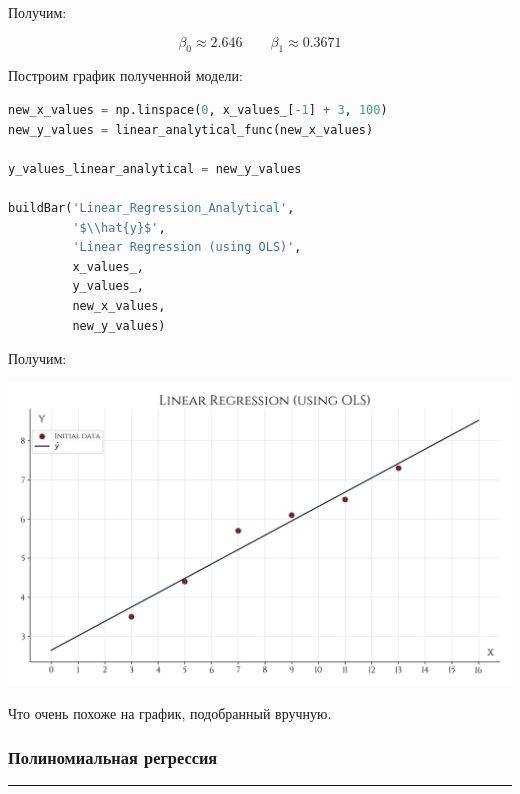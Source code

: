 \documentclass[a4paper, 14pt]{extarticle}
\begin{document}
Получим:

\begin{equation*}
    \beta_0 \approx 2.646 \qquad \beta_1 \approx 0.3671
\end{equation*}

Построим график полученной модели:

\begin{center}
    \begin{lstlisting}[language=Python]
new_x_values = np.linspace(0, x_values_[-1] + 3, 100)
new_y_values = linear_analytical_func(new_x_values)

y_values_linear_analytical = new_y_values

buildBar('Linear_Regression_Analytical', 
         '$\\hat{y}$', 
         'Linear Regression (using OLS)', 
         x_values_, 
         y_values_, 
         new_x_values, 
         new_y_values)
    \end{lstlisting}
\end{center}

Получим:

\begin{center}
    \includegraphics[width=1\textwidth, height=1\textheight, keepaspectratio]{Linear_Regression_Analytical} \\
\end{center}

Что очень похоже на график, подобранный вручную.

\subsubsection*{{Полиномиальная регрессия}}\vspace{-20pt}\rule{\linewidth}{0.1mm}
\end{document}
